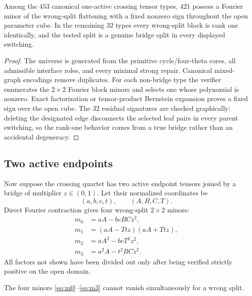 \begin{lemma}\label{lem:one-active}
Among the $453$ canonical one-active crossing tensor types, $421$ possess a Fourier minor of the wrong-split flattening with a fixed nonzero sign throughout the open parameter cube.  In the remaining $32$ types every wrong-split block is rank one identically, and the tested split is a genuine bridge split in every displayed switching.
\end{lemma}

\begin{proof}
The universe is generated from the primitive cycle/four-theta cores, all admissible interface roles, and every minimal strong repair.  Canonical mixed-graph encodings remove duplicates.  For each non-bridge type the verifier enumerates the $2\times2$ Fourier block minors and selects one whose polynomial is nonzero.  Exact factorization or tensor-product Bernstein expansion proves a fixed sign over the open cube.  The $32$ residual signatures are checked graphically: deleting the designated edge disconnects the selected leaf pairs in every parent switching, so the rank-one behavior comes from a true bridge rather than an accidental degeneracy.
\end{proof}



\subsection{Two active endpoints}

Now suppose the crossing quartet has two active endpoint tensors joined by a bridge of multiplier $z\in(0,1)$.  Let their normalized coordinates be
\[
(a,b,c,t),
\qquad
(A,B,C,T).
\]
Direct Fourier contraction gives four wrong-split $2\times2$ minors:
\begin{align}
m_0&=aA-bcBCz^2,\label{eq:m0}\\
m_1&=(aA-Ttz)(aA+Ttz),\label{eq:m1}\\
m_2&=aA^2-bcT^2z^2,\label{eq:m2}\\
m_3&=a^2A-t^2BCz^2.\label{eq:m3}
\end{align}
All factors not shown have been divided out only after being verified strictly positive on the open domain.

\begin{lemma}\label{lem:two-active}
The four minors \eqref{eq:m0}--\eqref{eq:m3} cannot vanish simultaneously for a wrong split.
\end{lemma}

